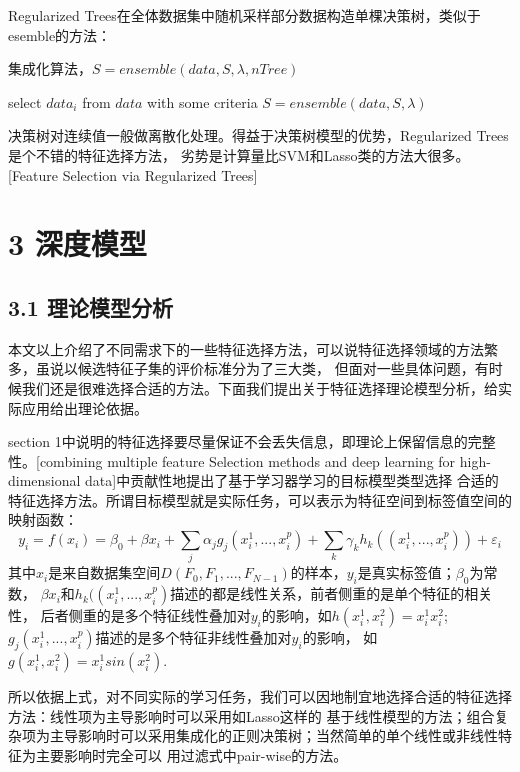\documentclass[a4paper,UTF8]{article}
\begin{document}
Regularized Trees在全体数据集中随机采样部分数据构造单棵决策树，类似于esemble的方法：
\begin{algorithm}
  \caption{集成化算法，$S=ensemble(data,S,\lambda,nTree)$}
  \begin{algorithmic}[1]

      \STATE select $data_{i}$ from $data$ with some criteria
      \STATE $S=ensemble(data,S,\lambda)$
    \ENDFOR
  \end{algorithmic}


\end{algorithm}

决策树对连续值一般做离散化处理。得益于决策树模型的优势，Regularized Trees是个不错的特征选择方法，
劣势是计算量比SVM和Lasso类的方法大很多。[Feature Selection via Regularized Trees]


\section*{3 深度模型}


\subsection*{3.1 理论模型分析}

本文以上介绍了不同需求下的一些特征选择方法，可以说特征选择领域的方法繁多，虽说以候选特征子集的评价标准分为了三大类，
但面对一些具体问题，有时候我们还是很难选择合适的方法。下面我们提出关于特征选择理论模型分析，给实际应用给出理论依据。

section 1中说明的特征选择要尽量保证不会丢失信息，即理论上保留信息的完整性。[combining multiple feature Selection
methods and deep learning for high-dimensional data]中贡献性地提出了基于学习器学习的目标模型类型选择
合适的特征选择方法。所谓目标模型就是实际任务，可以表示为特征空间到标签值空间的映射函数：
$$y_{i}=f(x_{i})=\beta_{0}+\beta x_{i}+\sum_{j}{\alpha_{j} g_{j}(x_{i}^{1},...,x_{i}^{p})}
+\sum_{k}{\gamma_{k} h_{k}((x_{i}^{1},...,x_{i}^{p}))}+\varepsilon_{i}$$
其中$x_{i}$是来自数据集空间$D(F_{0}, F_{1},..., F_{N-1})$的样本，$y_{i}$是真实标签值；$\beta_{0}$为常数，
$\beta x_{i}$和$h_{k}((x_{i}^{1},...,x_{i}^{p})$描述的都是线性关系，前者侧重的是单个特征的相关性，
后者侧重的是多个特征线性叠加对$y_{i}$的影响，如$h(x_{i}^{1},x_{i}^{2})=x_{i}^{1}x_{i}^{2}$;
$g_{j}(x_{i}^{1},...,x_{i}^{p})$描述的是多个特征非线性叠加对$y_{i}$的影响，
如$g(x_{i}^{1},x_{i}^{2})=x_{i}^{1}sin(x_{i}^{2})$.

所以依据上式，对不同实际的学习任务，我们可以因地制宜地选择合适的特征选择方法：线性项为主导影响时可以采用如Lasso这样的
基于线性模型的方法；组合复杂项为主导影响时可以采用集成化的正则决策树；当然简单的单个线性或非线性特征为主要影响时完全可以
用过滤式中pair-wise的方法。
\end{document}
